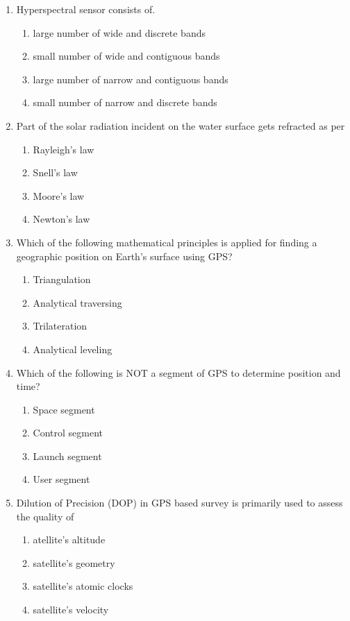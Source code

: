 \documentclass[12pt]{article}
\begin{document}
\begin{enumerate}
\item Hyperspectral sensor consists of.
\begin{enumerate}
    \item large number of wide and discrete bands 
   \item small number of wide and contiguous bands  
   \item large number of narrow and contiguous bands 
   \item small number of narrow and discrete bands 
\end{enumerate}

\item Part of the solar radiation incident on the water surface gets refracted as per

\begin{enumerate}
    \item Rayleigh’s law 
   \item Snell’s law 
   \item Moore’s law  
   \item Newton’s law 
\end{enumerate}

\item Which of the following mathematical principles is applied for finding a
geographic position on Earth’s surface using GPS?

\begin{enumerate}
   \item Triangulation 
   \item Analytical traversing  
   \item Trilateration 
   \item Analytical leveling
\end{enumerate}

\item Which of the following is NOT a segment of GPS to determine position and time?
\begin{enumerate}
    \item Space segment 
   \item Control segment 
   \item Launch segment 
   \item User segment
\end{enumerate}

\item Dilution of Precision (DOP) in GPS based survey is primarily used to assess the
quality of
\begin{enumerate}
    \item atellite’s altitude 
   \item satellite’s geometry  
   \item satellite’s atomic clocks 
   \item satellite’s velocity 
\end{enumerate}


\end{enumerate}
\end{document}
